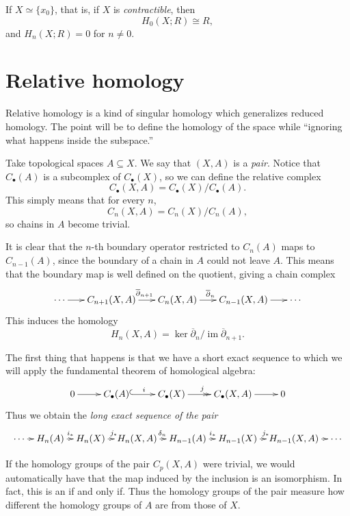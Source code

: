 \begin{example}
If $X\simeq\{x_0\}$, that is, if $X$ is
\emph{contractible}, then
$$
H_0(X;R)\cong R,
$$
and $H_n(X;R)=0$ for $n\neq0$.
\end{example}
\section{Relative homology}
\label{section-relative-homology}

Relative homology is a kind of singular
homology which
generalizes reduced homology. The point will
be to define the
homology of the space while ``ignoring what
happens inside
the subspace.''

Take topological spaces $A\subseteq X$. We
say that $(X,A)$
is a \emph{pair}. Notice that $C_\bullet(A)$
is a
subcomplex of $C_\bullet(X)$, so we can
define the relative
complex
$$
C_\bullet(X,A)=C_\bullet(X)/C_\bullet(A).
$$
This simply means that for every $n$,
$$
C_n(X,A)=C_n(X)/C_n(A),
$$
so chains in $A$ become trivial.

It is clear that the $n$-th boundary operator
restricted to
$C_n(A)$ maps to $C_{n-1}(A)$, since the
boundary of a chain
in $A$ could not leave $A$. This means that
the boundary map
is well defined on the quotient, giving a
chain complex
$$
\xymatrix@C=1.7em{
\cdots \ar[r]
 & C_{n+1}(X,A)
   \ar[r]^{\overline\partial_{n+1}}
 & C_n(X,A) \ar[r]^{\overline\partial_n}
 & C_{n-1}(X,A) \ar[r]
 & \cdots
}
$$
This induces the homology
$$
H_n(X,A)=
\ker\overline\partial_n/
\operatorname{im}\overline\partial_{n+1}.
$$

The first thing that happens is that we have
a short exact
sequence to which we will apply the
fundamental theorem of
homological algebra:
$$
\xymatrix{
0 \ar[r]
 & C_\bullet(A) \ar@{^{(}->}[r]^i
 & C_\bullet(X) \ar@{->>}[r]^j
 & C_\bullet(X,A) \ar[r]
 & 0
}
$$
Thus we obtain the \emph{long exact sequence
of the pair}
$$
\xymatrix@C=.65em{
\cdots \ar[r]
 & H_n(A) \ar[r]^{i_*}
 & H_n(X) \ar[r]^{j_*}
 & H_n(X,A) \ar[r]^{\delta_n}
 & H_{n-1}(A) \ar[r]^{i_*}
 & H_{n-1}(X) \ar[r]^{j_*}
 & H_{n-1}(X,A) \ar[r]
 & \cdots
}
$$

\begin{remark}
If the homology groups of the pair $C_p(X,A)$
were trivial,
we would automatically have that the map
induced by the
inclusion is an isomorphism. In fact, this is
an if and only
if. Thus the homology groups of the pair
measure how
different the homology groups of $A$ are from
those of $X$.
\end{remark}

